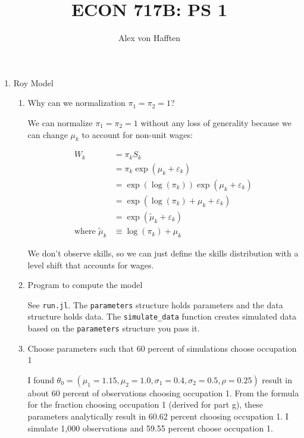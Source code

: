 \documentclass{article}
\title{ECON 717B: PS 1}
\author{Alex von Hafften}
\begin{document}
\maketitle

\begin{enumerate}

\item Roy Model

\begin{enumerate}

\item Why can we normalization $\pi_1 =\pi_2 = 1$?

\bigskip

We can normalize $\pi_1 = \pi_2 = 1$ without any loss of generality because we can change $\mu_k$ to account for non-unit wages:

\begin{align*}
W_k 
&= \pi_k S_k\\
&= \pi_k \exp(\mu_k + \varepsilon_k) \\
&= \exp(\log(\pi_k)) \exp(\mu_k + \varepsilon_k) \\
&= \exp(\log(\pi_k)+\mu_k + \varepsilon_k) \\
&= \exp(\tilde\mu_k + \varepsilon_k) \\
\text{where } \tilde\mu_k &\equiv  \log(\pi_k)+\mu_k
\end{align*}

We don't observe skills, so we can just define the skills distribution with a level shift that accounts for wages.

\bigskip

\item Program to compute the model

\bigskip

See \texttt{run.jl}.  The \texttt{parameters} structure holds parameters and the data structure holds data. The \texttt{simulate\_data} function creates simulated data based on the \texttt{parameters} structure you pass it.

\bigskip

\item Choose parameters such that 60 percent of simulations choose occupation 1

\bigskip

I found $\theta_0 = (\mu_1 = 1.15, \mu_2 = 1.0, \sigma_1 = 0.4, \sigma_2 = 0.5, \rho = 0.25)$ result in about 60 percent of observations choosing occupation 1.  From the formula for the fraction choosing occupation 1 (derived for part g), these parameters analytically result in 60.62 percent choosing occupation 1.  I simulate 1,000 observations and 59.55 percent choose occupation 1.


\end{enumerate}
\end{enumerate}
\end{document}
